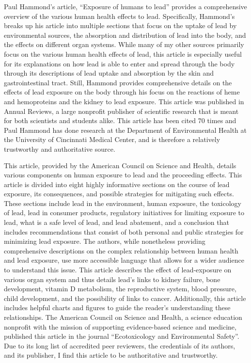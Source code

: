 \documentclass{article}\usepackage[]{graphicx}\usepackage[]{color}
\begin{document}
Paul Hammond’s article, “Exposure of humans to lead” provides a comprehensive overview of the various human health effects to lead. Specifically, Hammond’s breaks up his article into multiple sections that focus on the uptake of lead by environmental sources, the absorption and distribution of lead into the body, and the effects on different organ systems.  While many of my other sources primarily focus on the various human health effects of lead, this article is especially useful for its explanations on how lead is able to enter and spread through the body through its descriptions of lead uptake and absorption by the skin and gastrointestinal tract. Still, Hammond provides comprehensive details on the effects of lead exposure on the body through his focus on the reactions of heme and hemoproteins and the kidney to lead exposure.  This article was published in Annual Reviews, a large nonprofit publisher of scientific research that is meant for both scientists and students alike. This article has been cited 70 times and Paul Hammond has done research at the Department of Environmental Health at the University of Cincinnati Medical Center, and is therefore a relatively trustworthy and authoritative source. 



This article, provided by the American Council on Science and Health, details various components on human exposure to lead and the proceeding effects. This article is divided into eight highly informative sections on the course of lead exposure, its consequences, and possible strategies for mitigating such effects. These sections include lead in the environment, human exposure, the toxicology of lead, lead in consumer products, regulatory initiatives for limiting exposure to lead, what is a safe level of lead, and lead abatement, and a conclusion that includes recommendations that consist of both personal and public strategies for minimizing lead exposure.  The authors, while nonetheless providing comprehensive descriptions on the complex relationship between human health and lead exposure, use more accessible language that allows for a wider audience to understand this issue. This article describes the effect of lead-exposure on various organ system and thus details lead’s links to kidney failure, bone development, vitamin D metabolism, the reproductive system, blood pressure, child development, and the possibility of links to cancer.  Additionally, this article includes helpful charts and figures to guide the reader’s understanding these relationships. The American Council on Science and Health, a science education nonprofit with the mission of supporting evidence-based science and medicine, published this article in the journal “Ecotoxicology and Environmental Safety”. Due to its long list of accredited peer reviewers, the credentials of its authors, and its publisher, I find this article to be authoritative and trustworthy. 
\end{document}
